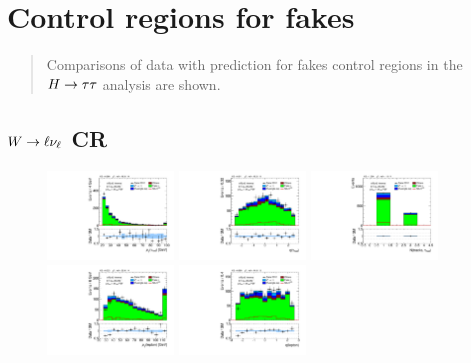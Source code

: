 \chapter[Control regions for fakes][Control regions for fakes]{Control regions for fakes}
\label{apx:control-regions}

\begin{quote}
Comparisons of data with prediction for fakes control regions in the $H\rightarrow\tau\tau$ analysis are shown.
\end{quote}

\section{$W \rightarrow \ell\nu_\ell$ CR}

\begin{figure}[!htpb]
  \centering
  \includegraphics[width=0.30\textwidth]{figures/analysis/vbf-WlvCR/tau-pt}
  \includegraphics[width=0.30\textwidth]{figures/analysis/vbf-WlvCR/tau-eta}
  \includegraphics[width=0.30\textwidth]{figures/analysis/vbf-WlvCR/tau-numTrack}
  \includegraphics[width=0.30\textwidth]{figures/analysis/vbf-WlvCR/lep-pt-hi}
  \includegraphics[width=0.30\textwidth]{figures/analysis/vbf-WlvCR/lep-eta}

\end{figure}
